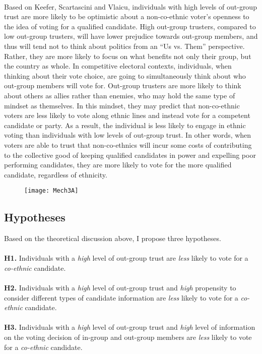 \documentclass[a4paper, 12pt]{article}
\begin{document}
\paragraph{}
Based on Keefer, Scartascini and Vlaicu\cite{keeferSocialTrustElectoral2019}, individuals with high levels of out-group trust are more likely to be optimistic about a non-co-ethnic voter’s openness to the idea of voting for a qualified candidate. High out-group trusters, compared to low out-group trusters, will have lower prejudice towards out-group members, and thus will tend not to think about politics from an “Us vs. Them” perspective. Rather, they are more likely to focus on what benefits not only their group, but the country as whole. In competitive electoral contexts, individuals, when thinking about their vote choice, are going to simultaneously think about who out-group members will vote for. Out-group trusters are more likely to think about others as allies rather than enemies, who may hold the same type of mindset as themselves. In this mindset, they may predict that non-co-ethnic voters are less likely to vote along ethnic lines and instead vote for a competent candidate or party. As a result, the individual is less likely to engage in ethnic voting than individuals with low levels of out-group trust. In other words, when voters are able to trust that non-co-ethnics will incur some costs of contributing to the collective good of keeping qualified candidates in power and expelling poor performing candidates, they are more likely to vote for the more qualified candidate, regardless of ethnicity.
\begin{figure}[H]
	\centering
	\texttt{[image: Mech3A]}
\end{figure}

\subsection{Hypotheses}
Based on the theoretical discussion above, I propose three hypotheses.\\
\\\textbf{H1.} Individuals with a \textit{high} level of out-group trust are \textit{less} likely to vote for a \textit{co-ethnic} candidate.\\
\\\textbf{H2.} Individuals with a \textit{high} level of out-group trust and \textit{high} propensity to consider different types of candidate information are \textit{less} likely to vote for a \textit{co-ethnic} candidate.\\
\\\textbf{H3.} Individuals with a \textit{high} level of out-group trust and \textit{high} level of information on the voting decision of in-group and out-group members are \textit{less} likely to vote for a \textit{co-ethnic} candidate.\\
\end{document}
